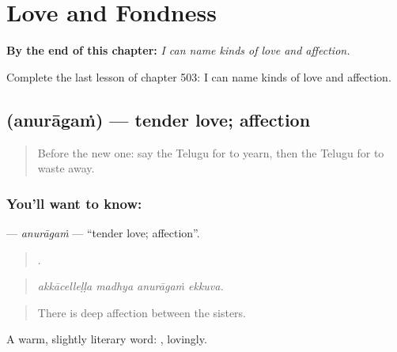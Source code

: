 
\chapter{Love and Fondness}
\label{ch:te-love-and-fondness}

\begin{chapteropening}
\textbf{By the end of this chapter:} \emph{I can name kinds of love and affection.}

Complete the last lesson of chapter 503: I can name kinds of love and affection.
\end{chapteropening}

\section[\texorpdfstring{\te{అనురాగం} (anurāgaṁ)}{అనురాగం (anurāgaṁ)}]{ (anurāgaṁ) — tender love; affection}

\label{lesson:TE-C503-anuragam}



\begin{quote}
Before the new one: say the Telugu for to yearn, then the Telugu for to waste away.
\end{quote}

\subsection*{You'll want to know: }
\textbf{} — \emph{anurāgaṁ} — \textquotedblleft{}tender love; affection\textquotedblright{}.

\begin{quote}
   .
\end{quote}

\begin{quote}
\emph{akkācelleḷḷa madhya anurāgaṁ ekkuva.}
\end{quote}

\begin{quote}
There is deep affection between the sisters.
\end{quote}

A warm, slightly literary word: , lovingly.

